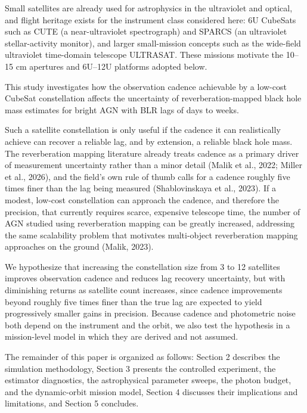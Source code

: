 \documentclass[11pt]{article}
\begin{document}
Small satellites are already used for astrophysics in the ultraviolet and optical, and flight heritage exists for the instrument class considered here: 6U CubeSats such as CUTE (a near-ultraviolet spectrograph) and SPARCS (an ultraviolet stellar-activity monitor), and larger small-mission concepts such as the wide-field ultraviolet time-domain telescope ULTRASAT. These missions motivate the 10--15 cm apertures and 6U--12U platforms adopted below.

This study investigates how the observation cadence achievable by a low-cost CubeSat constellation affects the uncertainty of reverberation-mapped black hole mass estimates for bright AGN with BLR lags of days to weeks.

Such a satellite constellation is only useful if the cadence it can realistically achieve can recover a reliable lag, and by extension, a reliable black hole mass. The reverberation mapping literature already treats cadence as a primary driver of measurement uncertainty rather than a minor detail (Malik et al., 2022; Miller et al., 2026), and the field's own rule of thumb calls for a cadence roughly five times finer than the lag being measured (Shablovinskaya et al., 2023). If a modest, low-cost constellation can approach the cadence, and therefore the precision, that currently requires scarce, expensive telescope time, the number of AGN studied using reverberation mapping can be greatly increased, addressing the same scalability problem that motivates multi-object reverberation mapping approaches on the ground (Malik, 2023).

We hypothesize that increasing the constellation size from 3 to 12 satellites improves observation cadence and reduces lag recovery uncertainty, but with diminishing returns as satellite count increases, since cadence improvements beyond roughly five times finer than the true lag are expected to yield progressively smaller gains in precision. Because cadence and photometric noise both depend on the instrument and the orbit, we also test the hypothesis in a mission-level model in which they are derived and not assumed.

The remainder of this paper is organized as follows: Section 2 describes the simulation methodology, Section 3 presents the controlled experiment, the estimator diagnostics, the astrophysical parameter sweeps, the photon budget, and the dynamic-orbit mission model, Section 4 discusses their implications and limitations, and Section 5 concludes.
\end{document}
